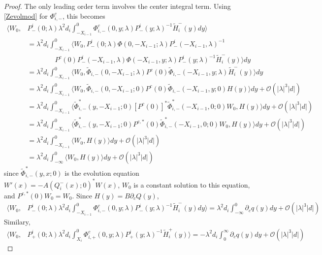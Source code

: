 \documentclass[thesis.tex]{subfiles}
\begin{document}
\begin{lemma}
\begin{proof}
The only leading order term involves the center integral term. Using \cref{Zevolmod} for $\Phi^c_{i,-}$, this becomes
\begin{align*}
\langle W_0, &P^i_-(0; \lambda) \lambda^2 d_i \int_{-X_{i-1}}^0 \Phi^c_{i,-}(0, y; \lambda) P^i_-(y; \lambda)^{-1} \tilde{H}_i^-(y) dy \rangle \\
&= \lambda^2 d_i \int_{-X_{i-1}}^0 \langle W_0, P^i_-(0; \lambda) \Phi(0, -X_{i-1}; \lambda) P^i_-(-X_{i-1}, \lambda)^{-1} \\
&\qquad \qquad
P^c(0) P^i_-(-X_{i-1}, \lambda) \Phi(-X_{i-1}, y; \lambda) P^i_-(y; \lambda)^{-1} \tilde{H}_i^-(y) \rangle dy \\
&= \lambda^2 d_i \int_{-X_{i-1}}^0 \langle W_0, \tilde{\Phi}_{i,-}(0, -X_{i-1}; \lambda) 
P^c(0) \tilde{\Phi}_{i,-}(-X_{i-1}, y; \lambda) \tilde{H}_i^-(y) \rangle dy \\ 
&= \lambda^2 d_i \int_{-X_{i-1}}^0 \langle W_0, \tilde{\Phi}_{i,-}(0, -X_{i-1}; 0) 
P^c(0) \tilde{\Phi}_{i,-}(-X_{i-1}, y; 0) H(y) \rangle dy + \mathcal{O}(|\lambda|^3 |d|) \\
&= \lambda^2 d_i \int_{-X_{i-1}}^0 \langle \tilde{\Phi}^*_{i,-}(y, -X_{i-1}; 0) [P^c(0)]^* \tilde{\Phi}^*_{i,-}(-X_{i-1}, 0; 0) W_0,
 H(y) \rangle dy + \mathcal{O}(|\lambda|^3 |d|) \\
&= \lambda^2 d_i \int_{-X_{i-1}}^0 \langle \tilde{\Phi}^*_{i,-}(y, -X_{i-1}; 0) P^{c,*}(0) \tilde{\Phi}^*_{i,-}(-X_{i-1}, 0; 0) W_0,
 H(y) \rangle dy + \mathcal{O}(|\lambda|^3 |d|) \\
&= \lambda^2 d_i \int_{-X_{i-1}}^0 \langle W_0, H(y) \rangle dy + \mathcal{O}(|\lambda|^3 |d|) \\
&= \lambda^2 d_i \int_{-\infty}^0 \langle W_0, H(y) \rangle dy + \mathcal{O}(|\lambda|^3 |d|)
\end{align*}
since $\tilde{\Phi}_{i,-}^*(y, x; 0)$ is the evolution equation $W'(x) = -A(Q_i^-(x); 0)^* W(x)$, $W_0$ is a constant solution to this equation, and $P^{c,*}(0) W_0 = W_0$. Since $H(y) = B \partial_c Q(y)$,
\begin{align*}
\langle W_0, &P^i_-(0; \lambda) \lambda^2 d_i \int_{-X_{i-1}}^0 \Phi^c_{i,-}(0, y; \lambda) P^i_-(y; \lambda)^{-1} \tilde{H}_i^-(y) dy \rangle 
= \lambda^2 d_i \int_{-\infty}^0 \partial_c q(y)dy + \mathcal{O}(|\lambda|^3 |d|)
\end{align*}
Similary, 
\begin{align*}
\langle W_0, &P^i_+(0; \lambda) \lambda^2 d_i \int_{X_i}^0 \Phi^c_{i,+}(0, y; \lambda) P^i_+(y; \lambda)^{-1}   \tilde{H}_i^+(y) \rangle 
= -\lambda^2 d_i \int_0^{\infty} \partial_c q(y)dy + \mathcal{O}(|\lambda|^3 |d|)
\end{align*}


\end{proof}
\end{lemma}
\end{document}

